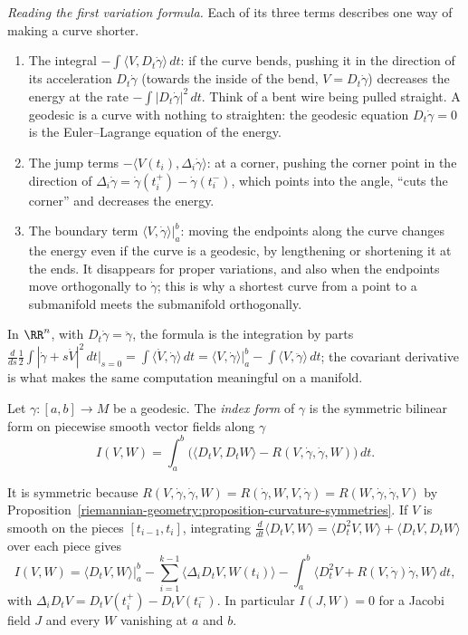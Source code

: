 \emph{Reading the first variation formula.} Each of its three terms describes one way of making a curve shorter.
\begin{enumerate}
\item The integral $-\int\langle V, D_t\dot\gamma\rangle\,dt$: if the curve bends, pushing it in the direction of its acceleration $D_t\dot\gamma$ (towards the inside of the bend, $V = D_t\dot\gamma$)
decreases the energy at the rate $-\int|D_t\dot\gamma|^2\,dt$. Think of a bent wire being pulled straight. A geodesic is a curve with nothing to straighten: the geodesic equation
$D_t\dot\gamma = 0$ is the Euler--Lagrange equation of the energy.
\item The jump terms $-\langle V(t_i), \Delta_i\dot\gamma\rangle$: at a corner, pushing the corner point in the direction of $\Delta_i\dot\gamma = \dot\gamma(t_i^+) - \dot\gamma(t_i^-)$, which
points into the angle, ``cuts the corner'' and decreases the energy.
\item The boundary term $\langle V, \dot\gamma\rangle|_a^b$: moving the endpoints along the curve changes the energy even if the curve is a geodesic, by lengthening or shortening it at the
ends. It disappears for proper variations, and also when the endpoints move orthogonally to $\dot\gamma$; this is why a shortest curve from a point to a submanifold meets the submanifold
orthogonally.
\end{enumerate}
In $\RR^n$, with $D_t\dot\gamma = \ddot\gamma$, the formula is the integration by parts $\frac{d}{ds}\frac12\int|\dot\gamma + s\dot V|^2\,dt\big|_{s=0} = \int\langle\dot V, \dot\gamma\rangle\,dt =
\langle V, \dot\gamma\rangle|_a^b - \int\langle V, \ddot\gamma\rangle\,dt$; the covariant derivative is what makes the same computation meaningful on a manifold.

\begin{definition}\label{riemannian-geometry:definition-index-form}
Let $\gamma \colon [a, b] \to M$ be a geodesic. The \emph{index form} of $\gamma$ is the symmetric bilinear form on piecewise smooth vector fields along $\gamma$
\[
I(V, W) = \int_a^b\bigl(\langle D_tV, D_tW\rangle - R(V, \dot\gamma, \dot\gamma, W)\bigr)\,dt .
\]
\end{definition}

It is symmetric because $R(V, \dot\gamma, \dot\gamma, W) = R(\dot\gamma, W, V, \dot\gamma) = R(W, \dot\gamma, \dot\gamma, V)$ by
Proposition~\ref{riemannian-geometry:proposition-curvature-symmetries}. If $V$ is smooth on the pieces $[t_{i-1}, t_i]$, integrating
$\frac{d}{dt}\langle D_tV, W\rangle = \langle D_t^2V, W\rangle + \langle D_tV, D_tW\rangle$ over each piece gives
\begin{equation}\label{riemannian-geometry:equation-index-form-parts}
I(V, W) = \langle D_tV, W\rangle\Big|_a^b - \sum_{i=1}^{k-1}\langle\Delta_iD_tV, W(t_i)\rangle - \int_a^b\langle D_t^2V + R(V, \dot\gamma)\dot\gamma, W\rangle\,dt,
\end{equation}
with $\Delta_iD_tV = D_tV(t_i^+) - D_tV(t_i^-)$. In particular $I(J, W) = 0$ for a Jacobi field $J$ and every $W$ vanishing at $a$ and $b$.

